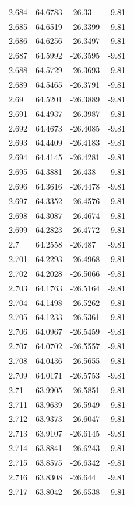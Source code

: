 \begin{tabular}{llll}
2.684 & 64.6783 & -26.33 & -9.81 \\
2.685 & 64.6519 & -26.3399 & -9.81 \\
2.686 & 64.6256 & -26.3497 & -9.81 \\
2.687 & 64.5992 & -26.3595 & -9.81 \\
2.688 & 64.5729 & -26.3693 & -9.81 \\
2.689 & 64.5465 & -26.3791 & -9.81 \\
2.69 & 64.5201 & -26.3889 & -9.81 \\
2.691 & 64.4937 & -26.3987 & -9.81 \\
2.692 & 64.4673 & -26.4085 & -9.81 \\
2.693 & 64.4409 & -26.4183 & -9.81 \\
2.694 & 64.4145 & -26.4281 & -9.81 \\
2.695 & 64.3881 & -26.438 & -9.81 \\
2.696 & 64.3616 & -26.4478 & -9.81 \\
2.697 & 64.3352 & -26.4576 & -9.81 \\
2.698 & 64.3087 & -26.4674 & -9.81 \\
2.699 & 64.2823 & -26.4772 & -9.81 \\
2.7 & 64.2558 & -26.487 & -9.81 \\
2.701 & 64.2293 & -26.4968 & -9.81 \\
2.702 & 64.2028 & -26.5066 & -9.81 \\
2.703 & 64.1763 & -26.5164 & -9.81 \\
2.704 & 64.1498 & -26.5262 & -9.81 \\
2.705 & 64.1233 & -26.5361 & -9.81 \\
2.706 & 64.0967 & -26.5459 & -9.81 \\
2.707 & 64.0702 & -26.5557 & -9.81 \\
2.708 & 64.0436 & -26.5655 & -9.81 \\
2.709 & 64.0171 & -26.5753 & -9.81 \\
2.71 & 63.9905 & -26.5851 & -9.81 \\
2.711 & 63.9639 & -26.5949 & -9.81 \\
2.712 & 63.9373 & -26.6047 & -9.81 \\
2.713 & 63.9107 & -26.6145 & -9.81 \\
2.714 & 63.8841 & -26.6243 & -9.81 \\
2.715 & 63.8575 & -26.6342 & -9.81 \\
2.716 & 63.8308 & -26.644 & -9.81 \\
2.717 & 63.8042 & -26.6538 & -9.81 \\

\end{tabular}
